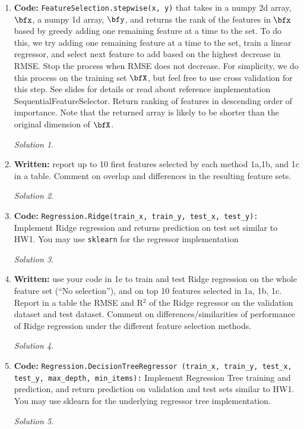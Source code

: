 \documentclass[a4paper,12pt]{article}
\theoremstyle{definition}
\theoremstyle{remark}
\newtheorem*{solution}{Solution}
\begin{document}
\begin{enumerate}
\begin{enumerate}
			\item {\bf Code:} {\tt FeatureSelection.stepwise(x, y)} that takes in a numpy 2d array, $\bfx$, a numpy 1d array, $\bfy$, and returns the rank of the features in $\bfx$ based by greedy adding one remaining feature at a time to the set. To do this, we try adding one remaining feature at a time to the set, train a linear regressor, and select next feature to add based on the highest decrease in RMSE. Stop the process when RMSE does not decrease. For simplicity, we do this process on the training set $\bfX$, but feel free to use cross validation for this step. See slides for details or read about reference implementation SequentialFeatureSelector. Return ranking of features in descending order of importance. Note that the returned array is likely to be shorter than the original dimension of $\bfX$.
			\begin{solution}
				
			\end{solution}
			\item {\bf Written:} report up to 10 first features selected by each method 1a,1b, and 1c in a table. Comment on overlap and
			differences in the resulting feature sets.
			\begin{solution}
				
			\end{solution}
			\item {\bf Code:} {\tt Regression.Ridge(train\_x, train\_y, test\_x, test\_y):} Implement Ridge regression and returns prediction on test set similar to HW1. You may use {\tt sklearn} for the regressor implementation
			\begin{solution}
				 
			\end{solution}
			\item {\bf Written:} use your code in 1e to train and test Ridge regression on the whole feature set (“No selection”), and on
			top 10 features selected in 1a, 1b, 1c. Report in a table the RMSE and R$^2$ of the Ridge regressor on the
			validation dataset and test dataset. Comment on differences/similarities of performance of Ridge regression
			under the different feature selection methods.
			\begin{solution}
			
			\end{solution}
			\item {\bf Code:} {\tt Regression.DecisionTreeRegressor (train\_x, train\_y, test\_x, test\_y, max\_depth, min\_items):}
			Implement Regression Tree training and prediction, and return prediction on validation and test sets similar to
			HW1. You may use sklearn for the underlying regressor tree implementation.
			\begin{solution}
			

\end{solution}
\end{enumerate}
\end{enumerate}
\end{document}

